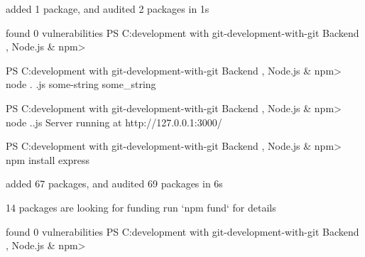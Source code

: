 added 1 package, and audited 2 packages in 1s

found 0 vulnerabilities
PS C:\Users\harsh\Downloads\html development with git\html-development-with-git Backend , Node.js & npm>





PS C:\Users\harsh\Downloads\html development with git\html-development-with-git Backend , Node.js & npm> node . \server.js
some-string
some_string




PS C:\Users\harsh\Downloads\html development with git\html-development-with-git Backend , Node.js & npm> node .\myserver.js
Server running at http://127.0.0.1:3000/






PS C:\Users\harsh\Downloads\html development with git\html-development-with-git Backend , Node.js & npm> npm install express

added 67 packages, and audited 69 packages in 6s       

14 packages are looking for funding
  run `npm fund` for details

found 0 vulnerabilities
PS C:\Users\harsh\Downloads\html development with git\html-development-with-git Backend , Node.js & npm>   